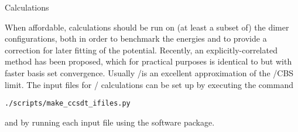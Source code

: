 
\begin{section}{\ccsdt Calculations}
\label{sec:workflow-ccsdt}

When affordable, \ccsdt calculations should be run on (at least a subset of) the
dimer configurations, both in order to benchmark the \dftsapt energies and to
provide a \dccsdt correction for later fitting of the \sapt potential.
Recently, an explicitly-correlated \ccsdtf method has been proposed, which for
practical purposes is identical to \ccsdt but with faster basis set
convergence.\cite{Knizia2009}
Usually /\avtzm is an excellent
approximation of the \ccsdt/CBS limit. The input files for \ccsdtf/\avtzm
calculations can be set up by executing the command
%
\begin{lstlisting}
./scripts/make_ccsdt_ifiles.py
\end{lstlisting}
%
and by running each input file using the \molpro software package.


\end{section}
